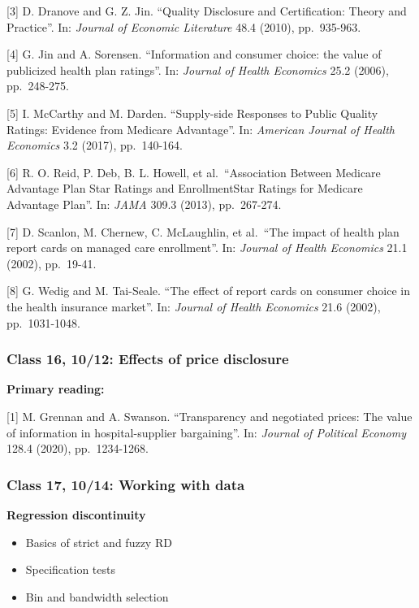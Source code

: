 \documentclass[11pt,]{article}
\providecommand{\tightlist}{%
  \setlength{\itemsep}{0pt}\setlength{\parskip}{0pt}}
\begin{document}
{[}3{]} D. Dranove and G. Z. Jin. ``Quality Disclosure and
Certification: Theory and Practice''. In: \emph{Journal of Economic
Literature} 48.4 (2010), pp.~935-963.

{[}4{]} G. Jin and A. Sorensen. ``Information and consumer choice: the
value of publicized health plan ratings''. In: \emph{Journal of Health
Economics} 25.2 (2006), pp.~248-275.

{[}5{]} I. McCarthy and M. Darden. ``Supply-side Responses to Public
Quality Ratings: Evidence from Medicare Advantage''. In: \emph{American
Journal of Health Economics} 3.2 (2017), pp.~140-164.

{[}6{]} R. O. Reid, P. Deb, B. L. Howell, et al.~``Association Between
Medicare Advantage Plan Star Ratings and EnrollmentStar Ratings for
Medicare Advantage Plan''. In: \emph{JAMA} 309.3 (2013), pp.~267-274.

{[}7{]} D. Scanlon, M. Chernew, C. McLaughlin, et al.~``The impact of
health plan report cards on managed care enrollment''. In: \emph{Journal
of Health Economics} 21.1 (2002), pp.~19-41.

{[}8{]} G. Wedig and M. Tai-Seale. ``The effect of report cards on
consumer choice in the health insurance market''. In: \emph{Journal of
Health Economics} 21.6 (2002), pp.~1031-1048.

\hypertarget{class-16-1012-effects-of-price-disclosure}{%
\subsubsection{Class 16, 10/12: Effects of price
disclosure}\label{class-16-1012-effects-of-price-disclosure}}

\textbf{Primary reading:}

{[}1{]} M. Grennan and A. Swanson. ``Transparency and negotiated prices:
The value of information in hospital-supplier bargaining''. In:
\emph{Journal of Political Economy} 128.4 (2020), pp.~1234-1268.

\hypertarget{class-17-1014-working-with-data}{%
\subsubsection{Class 17, 10/14: Working with
data}\label{class-17-1014-working-with-data}}

\textbf{Regression discontinuity}

\begin{itemize}
\tightlist
\item
  Basics of strict and fuzzy RD
\item
  Specification tests
\item
  Bin and bandwidth selection
\end{itemize}
\end{document}
